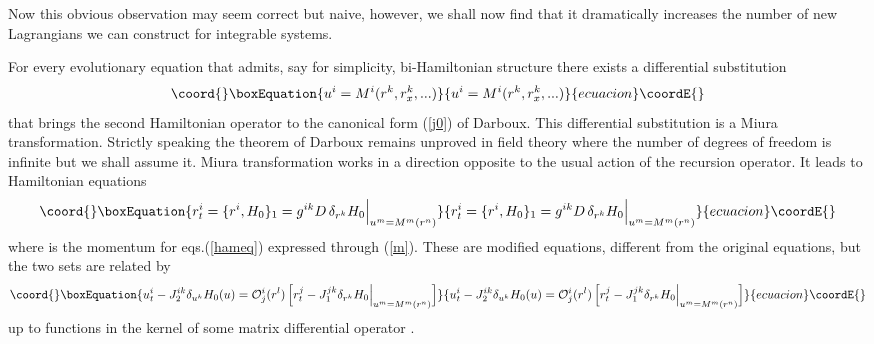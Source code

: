 \documentclass[a4paper,12pt]{article}
\begin{document}
Now this obvious observation may seem correct but naive, however,
we shall now find that it dramatically increases the number of new
Lagrangians we can construct for integrable systems.

For every evolutionary equation that admits, say for simplicity,
bi-Hamil\-tonian structure there exists a differential
substitution
\begin{equation}\coord{}\boxEquation{
u^i=M^i(r^k, r^k_x, ...) \label{m}
}{
u^i=M^i(r^k, r^k_x, ...) }{ecuacion}\coordE{}\end{equation}
that brings the second Hamiltonian operator to the canonical form
(\ref{j0}) of Darboux. This differential substitution is a Miura
transformation. Strictly speaking the theorem of Darboux remains
unproved in field theory where the number of degrees of freedom is
infinite but we shall assume it. Miura transformation works in a
direction opposite to the usual action of the recursion operator.
It leads to Hamiltonian equations
\begin{equation}\coord{}\boxEquation{
r^i_{t} = \{r^i, H_0\}_1 =  g^{ik} D \, \delta_{r^k}
H_0\Big|_{u^m=M^m(r^n)} \label{hameqmod}
}{
r^i_{t} = \{r^i, H_0\}_1 =  g^{ik} D \, \delta_{r^k}
H_0\Big|_{u^m=M^m(r^n)} }{ecuacion}\coordE{}\end{equation}
where \coordHE{} is the momentum for eqs.(\ref{hameq}) expressed
through (\ref{m}). These are modified equations, different from
the original equations, but the two sets are related by
\begin{equation}\coord{}\boxEquation{
u^i_{t} - J_2^{ik} \delta_{u^k} H_0 (u) = {\cal O}^i_j (r^l) \,
\Big[ r^j_{t} - J_1^{jk} \delta_{r^k} H_0 \Big|_{u^m=M^m(r^n)}
\Big] \label{mm3}
}{
u^i_{t} - J_2^{ik} \delta_{u^k} H_0 (u) = {\cal O}^i_j (r^l) \,
\Big[ r^j_{t} - J_1^{jk} \delta_{r^k} H_0 \Big|_{u^m=M^m(r^n)}
\Big] }{ecuacion}\coordE{}\end{equation}
up to functions in the kernel of some matrix differential operator
\coordHE{}.
\end{document}
